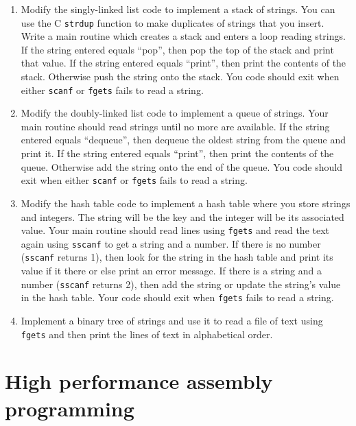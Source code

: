 \documentclass[11pt,b5paper]{book}
\begin{document}
\begin{enumerate}
    \item Modify the singly-linked list code to implement a stack of strings.
    You can use the C {\tt strdup} function to make duplicates of strings that
    you insert.
    Write a main routine which creates a stack and enters a loop reading strings.
    If the string entered equals ``pop'', then pop the top of the stack and print that
    value.
    If the string entered equals ``print'', then print the contents of the stack.
    Otherwise push the string onto the stack.
    You code should exit when either {\tt scanf} or {\tt fgets} fails to read a string.
    
    \item Modify the doubly-linked list code to implement a queue of strings.
    Your main routine should read strings until no more are available.
     If the string entered equals ``dequeue'', then dequeue the oldest string from the queue and print it.
     If the string entered equals ``print'', then print the contents of the queue.
    Otherwise add the string onto the end of the queue.
    You code should exit when either {\tt scanf} or {\tt fgets} fails to read a string.
    
    \item Modify the hash table code to implement a hash table where you store strings
    and integers.
    The string will be the key and the integer will be its associated value.
    Your main routine should read lines using {\tt fgets} and read the text again using
    {\tt sscanf} to get a string and a number.
    If there is no number ({\tt sscanf} returns 1), then look for the string in the hash table and
    print its value if it there or else print an error message.
    If there is a string and a number ({\tt sscanf} returns 2), then add the string or update the string's
    value in the hash table.
    Your code should exit when {\tt fgets} fails to read a string.
    
    \item Implement a binary tree of strings and use it to read a file of text using {\tt fgets} and then
    print the lines of text in alphabetical order.
    
\end{enumerate}

\chapter{High performance assembly programming}
\end{document}
